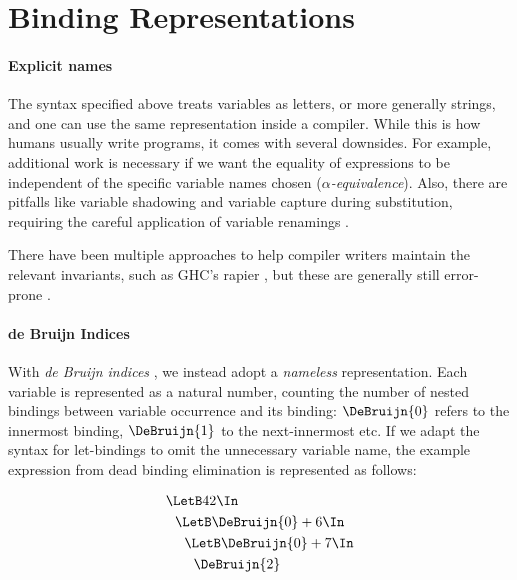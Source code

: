 \section{Binding Representations}
\label{sec:binding-representations}
  \paragraph{Explicit names}
    The syntax specified above treats variables as letters, or more generally strings,
    and one can use the same representation inside a compiler.
    While this is how humans usually write programs, it comes with several downsides.
    For example, additional work is necessary
    if we want the equality of expressions to be independent of the specific variable names chosen
    (\emph{$\alpha$-equivalence}).
    Also, there are pitfalls like variable shadowing and variable capture during substitution,
    requiring the careful application of variable renamings
    \cite{Barendregt1985LambdaCalculus}.

    There have been multiple approaches to help compiler writers maintain the relevant invariants,
    such as GHC's rapier \cite{Jones2002GHCInliner},
    but these are generally still error-prone
    \cite{Maclaurin2022Foil}.

  \paragraph{de Bruijn Indices}
    With \emph{de Bruijn indices}
    \cite{DeBruijn1972NamelessIndices},
    we instead adopt a \emph{nameless} representation.
    Each variable is represented as a natural number,
    counting the number of nested bindings between variable occurrence and its binding:
    $\DeBruijn{0}$ refers to the innermost binding, $\DeBruijn{1}$ to the next-innermost etc.
    If we adapt the syntax for let-bindings to omit the unnecessary variable name,
    the example expression from dead binding elimination is represented as follows:

    \begin{align*}
      &\LetB 42 \In                       \\
      &\ \ \LetB \DeBruijn{0} + 6 \In     \\
      &\ \ \ \ \LetB \DeBruijn{0} + 7 \In \\
      &\ \ \ \ \ \ \DeBruijn{2}
    \end{align*}

